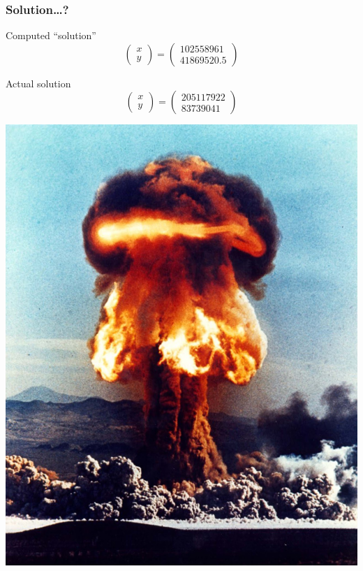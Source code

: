 \documentclass{beamer}
\begin{document}
\begin{frame}
    \frametitle{Solution\ldots?}

    Computed ``solution''
    \[
        \begin{pmatrix}
            x \\ y
        \end{pmatrix}
        =
        \begin{pmatrix}
            102558961 \\ 41869520.5
        \end{pmatrix}
    \]

    Actual solution
    \[
        \begin{pmatrix}
            x \\ y
        \end{pmatrix}
        =
        \begin{pmatrix}
            205117922 \\ 83739041
        \end{pmatrix}
    \]

\end{frame}

\begin{frame}
    \begin{center}
        \includegraphics[height=0.9\paperheight]{atomic_annie_1.jpg}
    \end{center}
\end{frame}
\end{document}
